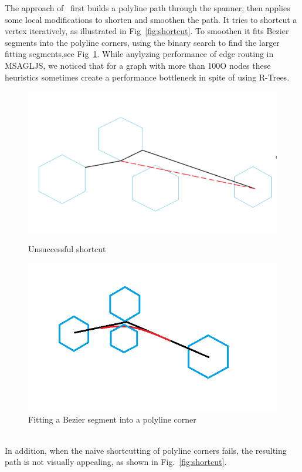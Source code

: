 \documentclass{gd-llncs}
\begin{document}
The approach of~\cite{dwyer2010fast} first builds a polyline path through the spanner, then applies some local modifications to shorten and smoothen the path. It tries to shortcut a vertex iteratively, as illustrated in Fig~\ref{fig:shortcut}. To smoothen it fits Bezier segments into the polyline corners, using the binary search to find the larger fitting segments,see Fig~\ref{fig:cornerfit}. While anylyzing performance of edge routing in MSAGLJS, we noticed that for a graph with more than 100O nodes these heuristics sometimes create a performance bottleneck in spite of using R-Trees\cite{guttman1984r}.
\begin{figure}[!tbp]
  \centering
  \begin{minipage}[b]{0.4\textwidth}
    \includegraphics[width=\textwidth]{./naive_shorcut_now_working.png}
    \caption{Unsuccessful shortcut}
    \label{fig:shortcut}
  \end{minipage}
  \hfill
  \begin{minipage}[b]{0.4\textwidth}
    \includegraphics[width=\textwidth]{fillet_corner.png}
    \caption{Fitting a Bezier segment into a polyline corner}
    \label{fig:cornerfit}
  \end{minipage}
\end{figure}
\\
In addition, when the naive shortcutting of polyline corners fails,  the resulting path is not visually appealing, as shown in Fig.~\ref{fig:shortcut}.
\end{document}

